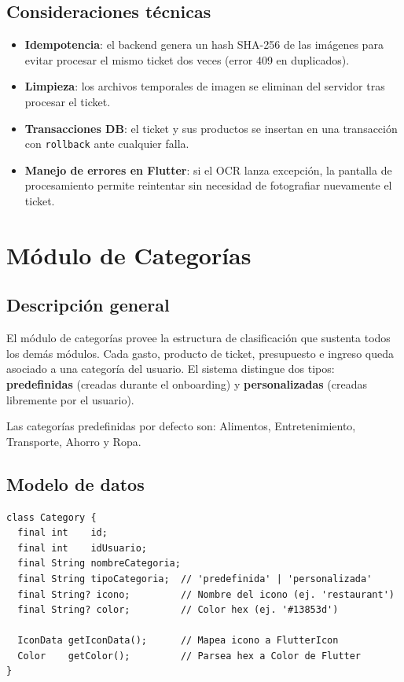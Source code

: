 \documentclass[12pt, letterpaper]{article}
\newcommand{\campo}[1]{\texttt{#1}}
\begin{document}
\subsection{Consideraciones técnicas}

\begin{itemize}
  \item \textbf{Idempotencia}: el backend genera un hash SHA-256 de las
        imágenes para evitar procesar el mismo ticket dos veces (error 409
        en duplicados).
  \item \textbf{Limpieza}: los archivos temporales de imagen se eliminan del
        servidor tras procesar el ticket.
  \item \textbf{Transacciones DB}: el ticket y sus productos se insertan en
        una transacción con \campo{rollback} ante cualquier falla.
  \item \textbf{Manejo de errores en Flutter}: si el OCR lanza excepción,
        la pantalla de procesamiento permite reintentar sin necesidad de
        fotografiar nuevamente el ticket.
\end{itemize}


\section{Módulo de Categorías}

\subsection{Descripción general}

El módulo de categorías provee la estructura de clasificación que sustenta
todos los demás módulos. Cada gasto, producto de ticket, presupuesto e ingreso
queda asociado a una categoría del usuario. El sistema distingue dos tipos:
\textbf{predefinidas} (creadas durante el onboarding) y \textbf{personalizadas}
(creadas libremente por el usuario).

Las categorías predefinidas por defecto son: Alimentos, Entretenimiento,
Transporte, Ahorro y Ropa.

\subsection{Modelo de datos}

\begin{lstlisting}
class Category {
  final int    id;
  final int    idUsuario;
  final String nombreCategoria;
  final String tipoCategoria;  // 'predefinida' | 'personalizada'
  final String? icono;         // Nombre del icono (ej. 'restaurant')
  final String? color;         // Color hex (ej. '#13853d')

  IconData getIconData();      // Mapea icono a FlutterIcon
  Color    getColor();         // Parsea hex a Color de Flutter
}
\end{lstlisting}
\end{document}
